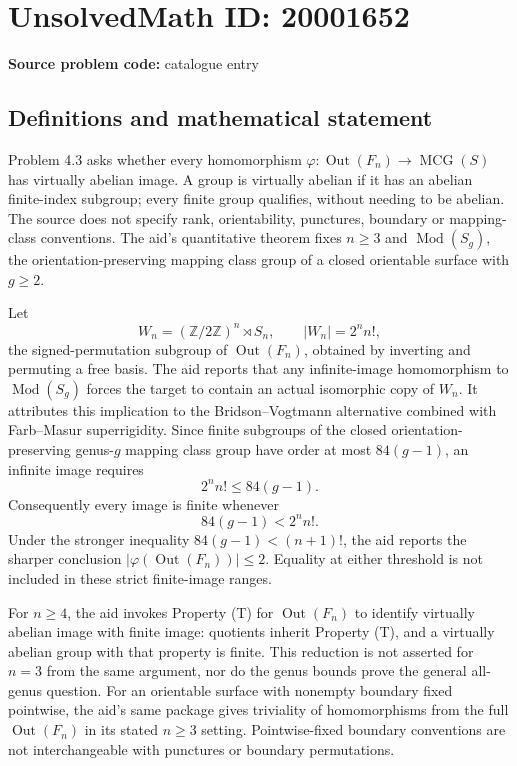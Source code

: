 \documentclass[11pt]{article}
\newcommand{\Z}{\mathbb{Z}}
\begin{document}
\section*{UnsolvedMath ID: 20001652}
\textbf{Source problem code:} catalogue entry
\subsection{Definitions and mathematical statement}
Problem 4.3 asks whether every homomorphism \(\varphi:\operatorname{Out}(F_n)\to\operatorname{MCG}(S)\) has virtually abelian image. A group is virtually abelian if it has an abelian finite-index subgroup; every finite group qualifies, without needing to be abelian. The source does not specify rank, orientability, punctures, boundary or mapping-class conventions. The aid's quantitative theorem fixes \(n\ge3\) and \(\operatorname{Mod}(S_g)\), the orientation-preserving mapping class group of a closed orientable surface with \(g\ge2\).

Let
\[
W_n=(\Z/2\Z)^n\rtimes S_n,\qquad |W_n|=2^n n!,
\]
the signed-permutation subgroup of \(\operatorname{Out}(F_n)\), obtained by inverting and permuting a free basis. The aid reports that any infinite-image homomorphism to \(\operatorname{Mod}(S_g)\) forces the target to contain an actual isomorphic copy of \(W_n\). It attributes this implication to the Bridson--Vogtmann alternative combined with Farb--Masur superrigidity. Since finite subgroups of the closed orientation-preserving genus-\(g\) mapping class group have order at most \(84(g-1)\), an infinite image requires
\[
2^n n!\le84(g-1).
\]
Consequently every image is finite whenever
\[
84(g-1)<2^n n!.
\]
Under the stronger inequality \(84(g-1)<(n+1)!\), the aid reports the sharper conclusion \(|\varphi(\operatorname{Out}(F_n))|\le2\). Equality at either threshold is not included in these strict finite-image ranges.

For \(n\ge4\), the aid invokes Property (T) for \(\operatorname{Out}(F_n)\) to identify virtually abelian image with finite image: quotients inherit Property (T), and a virtually abelian group with that property is finite. This reduction is not asserted for \(n=3\) from the same argument, nor do the genus bounds prove the general all-genus question. For an orientable surface with nonempty boundary fixed pointwise, the aid's same package gives triviality of homomorphisms from the full \(\operatorname{Out}(F_n)\) in its stated \(n\ge3\) setting. Pointwise-fixed boundary conventions are not interchangeable with punctures or boundary permutations.
\end{document}
